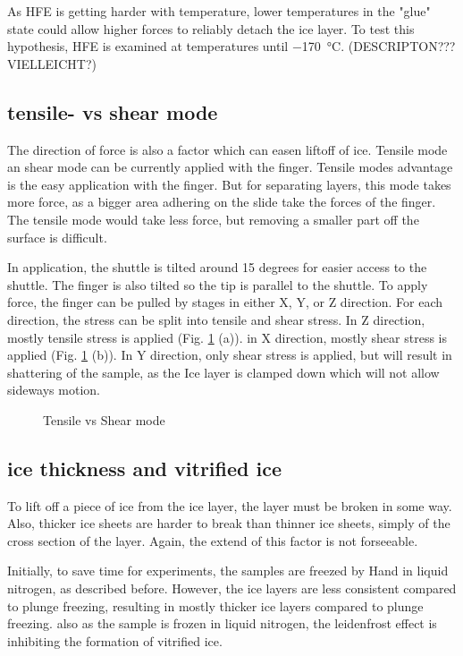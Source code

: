 As HFE is getting harder with temperature, lower temperatures in the "glue" state could allow higher forces to reliably detach the ice layer. To test this hypothesis, HFE is examined at temperatures until \SI{-170}{\degreeCelsius}. (DESCRIPTON??? VIELLEICHT?)

\subsection{tensile- vs shear mode}

The direction of force is also a factor which can easen liftoff of ice. Tensile mode an shear mode can be currently applied with the finger. Tensile modes advantage is the easy application with the finger. But for separating layers, this mode takes more force, as a bigger area adhering on the slide take the forces of the finger. The tensile mode would take less force, but removing a smaller part off the surface is difficult.

In application, the shuttle is tilted around 15 degrees for easier access to the shuttle. The finger is also tilted so the tip is parallel to the shuttle. To apply force, the finger can be pulled by stages in either X, Y, or Z direction. For each direction, the stress can be split into tensile and shear stress. In Z direction, mostly tensile stress is applied (Fig. \ref{fig:tensilevsshear} (a)). in X direction, mostly shear stress is applied (Fig. \ref{fig:tensilevsshear} (b)). In Y direction, only shear stress is applied, but will result in shattering of the sample, as the Ice layer is clamped down which will not allow sideways motion.



\begin{figure}[hbt!]
	\centering
	
	\caption{Tensile vs Shear mode}
	\label{fig:tensilevsshear}
\end{figure}

\subsection{ice thickness and vitrified ice}

To lift off a piece of ice from the ice layer, the layer must be broken in some way. Also, thicker ice sheets are harder to break than thinner ice sheets, simply of the cross section of the layer. Again, the extend of this factor is not forseeable. 

Initially, to save time for experiments, the samples are freezed by Hand in liquid nitrogen, as described before. However, the ice layers are less consistent compared to plunge freezing, resulting in mostly thicker ice layers compared to plunge freezing. also as the sample is frozen in liquid nitrogen, the leidenfrost effect is inhibiting the formation of vitrified ice. 

